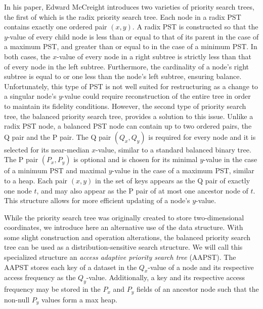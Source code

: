 \documentclass{article}
\begin{document}
In his paper, Edward McCreight introduces two varieties of priority search trees, the first of which is the radix priority search tree. Each node in a radix PST contains exactly one ordered pair $(x, y)$. A radix PST is constructed so that the $y$-value of every child node is less than or equal to that of its parent in the case of a maximum PST, and greater than or equal to in the case of a minimum PST. In both cases, the $x$-value of every node in a right subtree is strictly less than that of every node in the left subtree. Furthermore, the cardinality of a node’s right subtree is equal to or one less than the node’s left subtree, ensuring balance. Unfortunately, this type of PST is not well suited for restructuring as a change to a singular node's $y$-value could require reconstruction of the entire tree in order to maintain its fidelity conditions. However, the second type of priority search tree, the balanced priority search tree, provides a solution to this issue. Unlike a radix PST node, a balanced PST node can contain up to two ordered pairs, the Q pair and the P pair. The Q pair $(Q_x, Q_y)$ is required for every node and it is selected for its near-median $x$-value, similar to a standard balanced binary tree. The P pair $(P_x, P_y)$ is optional and is chosen for its minimal $y$-value in the case of a minimum PST and maximal $y$-value in the case of a maximum PST, similar to a heap. Each pair $(x, y)$ in the set of keys appears as the Q pair of exactly one node $t$, and may also appear as the P pair of at most one ancestor node of $t$. This structure allows for more efficient updating of a node's $y$-value.

While the priority search tree was originally created to store two-dimensional coordinates, we introduce here an alternative use of the data structure. With some slight construction and operation alterations, the balanced priority search tree can be used as a distribution-sensitive search structure. We will call this specialized structure an {\em access adaptive priority search tree} (AAPST). The AAPST stores each key of a dataset in the $Q_x$-value of a node and its respective access frequency as the $Q_y$-value. Additionally, a key and its respective access frequency may be stored in the $P_x$ and $P_y$ fields of an ancestor node such that the non-null $P_y$ values form a max heap.
\end{document}
